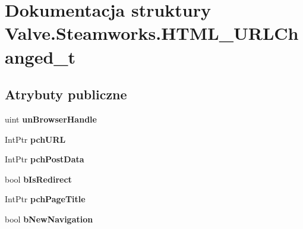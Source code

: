 \hypertarget{struct_valve_1_1_steamworks_1_1_h_t_m_l___u_r_l_changed__t}{}\section{Dokumentacja struktury Valve.\+Steamworks.\+H\+T\+M\+L\+\_\+\+U\+R\+L\+Changed\+\_\+t}
\label{struct_valve_1_1_steamworks_1_1_h_t_m_l___u_r_l_changed__t}
\subsection*{Atrybuty publiczne}
\begin{DoxyCompactItemize}
\item 
\mbox{\label{struct_valve_1_1_steamworks_1_1_h_t_m_l___u_r_l_changed__t_a0adc04269b3f613b1f28e7ea9114d8a2}} 
uint {\bfseries un\+Browser\+Handle}
\item 
\mbox{\label{struct_valve_1_1_steamworks_1_1_h_t_m_l___u_r_l_changed__t_a7a87925405e7130af37e273776efd2b8}} 
Int\+Ptr {\bfseries pch\+U\+RL}
\item 
\mbox{\label{struct_valve_1_1_steamworks_1_1_h_t_m_l___u_r_l_changed__t_aa145d051a95a558ab960ec08053a1965}} 
Int\+Ptr {\bfseries pch\+Post\+Data}
\item 
\mbox{\label{struct_valve_1_1_steamworks_1_1_h_t_m_l___u_r_l_changed__t_aaf242c7dc00913401b51818a7cc403a0}} 
bool {\bfseries b\+Is\+Redirect}
\item 
\mbox{\label{struct_valve_1_1_steamworks_1_1_h_t_m_l___u_r_l_changed__t_a3bf2a27a833f16c88ddb0d4e61a92ef5}} 
Int\+Ptr {\bfseries pch\+Page\+Title}
\item 
\mbox{\label{struct_valve_1_1_steamworks_1_1_h_t_m_l___u_r_l_changed__t_a44aaa18cebe29600e0e2bec867929f11}} 
bool {\bfseries b\+New\+Navigation}
\end{DoxyCompactItemize}


